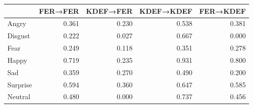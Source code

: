 \begin{tabular}{lrrrr}
\toprule
 & FER→FER & KDEF→FER & KDEF→KDEF & FER→KDEF \\
\midrule
Angry & 0.361 & 0.230 & 0.538 & 0.381 \\
Disgust & 0.222 & 0.027 & 0.667 & 0.000 \\
Fear & 0.249 & 0.118 & 0.351 & 0.278 \\
Happy & 0.719 & 0.235 & 0.931 & 0.800 \\
Sad & 0.359 & 0.270 & 0.490 & 0.200 \\
Surprise & 0.594 & 0.360 & 0.647 & 0.585 \\
Neutral & 0.480 & 0.000 & 0.737 & 0.456 \\
\bottomrule
\end{tabular}

